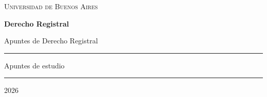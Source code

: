 \documentclass[12pt,oneside]{book}
\newcommand{\universidad}{Universidad de Buenos Aires}
\newcommand{\facultad}{}
\newcommand{\departamento}{}
\newcommand{\materia}{Derecho Registral}
\newcommand{\titulo}{Apuntes de \materia}
\newcommand{\autor}{}
\newcommand{\anio}{2026}
\begin{document}

\begin{titlepage}

\thispagestyle{empty}

\begin{center}

\vspace*{1cm}

%

\vspace{1cm}

{\large \textsc{\universidad}}

\vspace{0.2cm}

{\large \textsc{\facultad}}

\vspace{0.2cm}

{\large \departamento}

\vspace{3cm}

{\Huge \textbf{\materia}}

\vspace{1cm}

{\LARGE \titulo}

\vspace{1.5cm}

\rule{0.70\textwidth}{0.5pt}

\vspace{0.5cm}

{\large Apuntes de estudio}

\vspace{0.5cm}

\rule{0.70\textwidth}{0.5pt}

\vfill

{\large \autor}

\vspace{0.3cm}

{\large \anio}

\end{center}

\end{titlepage}

\end{document}
